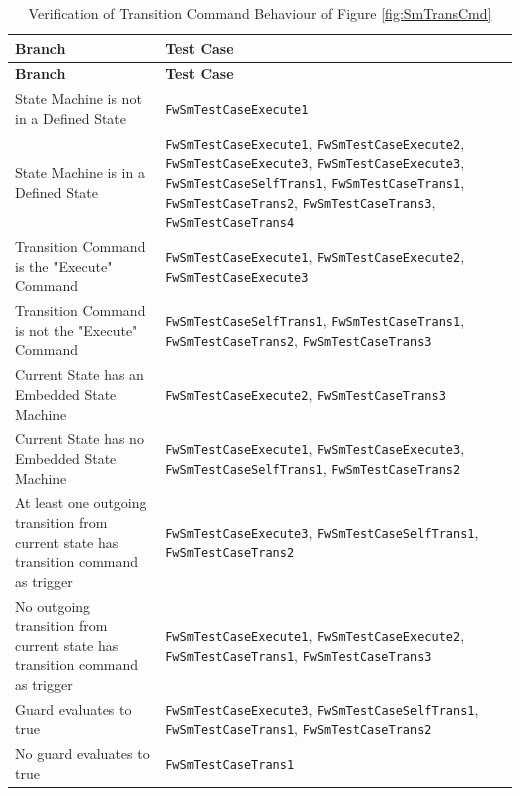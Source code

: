 \documentclass[a4paper,10pt]{article}
\begin{document}
\begin{longtable}{|p{6.7cm}|p{4.5cm}|}
\caption{Verification of Transition Command Behaviour of Figure \ref{fig:SmTransCmd}}
\label{tab:SM_Trans} \\
\hline
\rowcolor{gray}
\textbf{Branch} & \textbf{Test Case} \\
\hline
\endfirsthead
\rowcolor{gray}
\textbf{Branch} & \textbf{Test Case} \\
\hline
\endhead
State Machine is not in a Defined State & \texttt{FwSmTestCaseExecute1} \\
\hline
State Machine is in a Defined State & \texttt{FwSmTestCaseExecute1}, \texttt{FwSmTestCaseExecute2}, \texttt{FwSmTestCaseExecute3}, 
\texttt{FwSmTestCaseExecute3}, \texttt{FwSmTestCaseSelfTrans1}, \texttt{FwSmTestCaseTrans1}, \texttt{FwSmTestCaseTrans2}, 
\texttt{FwSmTestCaseTrans3}, \texttt{FwSmTestCaseTrans4} \\
\hline
Transition Command is the "Execute" Command & \texttt{FwSmTestCaseExecute1}, \texttt{FwSmTestCaseExecute2}, \texttt{FwSmTestCaseExecute3} \\
\hline
Transition Command is not the "Execute" Command & \texttt{FwSmTestCaseSelfTrans1}, \texttt{FwSmTestCaseTrans1}, \texttt{FwSmTestCaseTrans2}, 
\texttt{FwSmTestCaseTrans3} \\
\hline
Current State has an Embedded State Machine & \texttt{FwSmTestCaseExecute2}, \texttt{FwSmTestCaseTrans3} \\
\hline
Current State has no Embedded State Machine & \texttt{FwSmTestCaseExecute1}, \texttt{FwSmTestCaseExecute3}, \texttt{FwSmTestCaseSelfTrans1}, 
\texttt{FwSmTestCaseTrans2} \\
\hline
At least one outgoing transition from current state has transition command as trigger & \texttt{FwSmTestCaseExecute3}, \texttt{FwSmTestCaseSelfTrans1}, 
\texttt{FwSmTestCaseTrans2} \\
\hline
No outgoing transition from current state has transition command as trigger & \texttt{FwSmTestCaseExecute1}, \texttt{FwSmTestCaseExecute2}, 
\texttt{FwSmTestCaseTrans1}, \texttt{FwSmTestCaseTrans3} \\
\hline
Guard evaluates to true & \texttt{FwSmTestCaseExecute3}, \texttt{FwSmTestCaseSelfTrans1}, \texttt{FwSmTestCaseTrans1}, \texttt{FwSmTestCaseTrans2} \\
\hline
No guard evaluates to true & \texttt{FwSmTestCaseTrans1} \\
\hline
\end{longtable}
\end{document}
